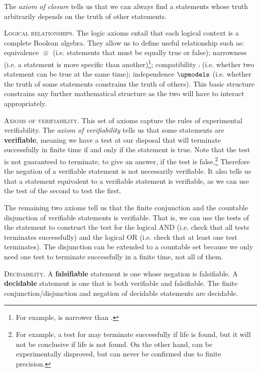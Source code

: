 \documentclass[10pt,twocolumn, nofootinbib]{revtex4-1}
\newcommand\partitle[1]{\textsc{#1}.}
\begin{document}
The \emph{axiom of closure} tells us that we can always find a statements whose truth arbitrarily depends on the truth of other statements.

\partitle{Logical relationships} The logic axioms entail that each logical context is a complete Boolean algebra. They allow us to define useful relationship such as: equivalence $\equiv$ (i.e. statements that must be equally true or false); narrowness (i.e. a statement is more specific than another)\footnote{For example,  is narrower than .}; compatibility $\comp$ (i.e. whether two statement can be true at the same time); independence $\indep$ (i.e. whether the truth of some statements constrains the truth of others). This basic structure constrains any further mathematical structure as the two will have to interact appropriately.

\partitle{Axioms of verifiability} This set of axioms capture the rules of experimental verifiability. The \emph{axiom of verifiability} tells us that some statements are \textbf{verifiable}, meaning we have a test at our disposal that will terminate successfully in finite time if and only if the statement is true. Note that the test is not guaranteed to terminate, to give an answer, if the test is false.\footnote{For example, a test for  may terminate successfully if life is found, but it will not be conclusive if life is not found. On the other hand,  can be experimentally disproved, but can never be confirmed due to finite precision.} Therefore the negation of a verifiable statement is not necessarily verifiable. It also tells us that a statement equivalent to a verifiable statement is verifiable, as we can use the test of the second to test the first.

The remaining two axioms tell us that the finite conjunction and the countable disjunction of verifiable statements is verifiable. That is, we can use the tests of the statement to construct the test for the logical AND (i.e. check that all tests terminates successfully) and the logical OR (i.e. check that at least one test terminates). The disjunction can be extended to a countable set because we only need one test to terminate successfully in a finite time, not all of them.

\partitle{Decidability} A \textbf{falsifiable} statement is one whose negation is falsifiable. A \textbf{decidable} statement is one that is both verifiable and falsifiable. The finite conjunction/disjunction and negation of decidable statements are decidable.
\end{document}
